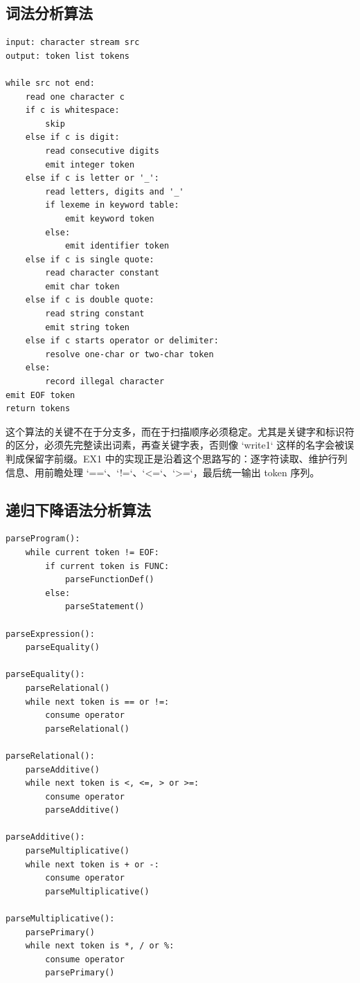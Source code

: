 \documentclass[UTF8,a4paper,12pt]{ctexart}
\begin{document}
\subsection*{词法分析算法}
\begin{lstlisting}[style=mandrillcode,caption={词法分析算法伪代码},label={lst:lexer-pseudo}]
input: character stream src
output: token list tokens

while src not end:
    read one character c
    if c is whitespace:
        skip
    else if c is digit:
        read consecutive digits
        emit integer token
    else if c is letter or '_':
        read letters, digits and '_'
        if lexeme in keyword table:
            emit keyword token
        else:
            emit identifier token
    else if c is single quote:
        read character constant
        emit char token
    else if c is double quote:
        read string constant
        emit string token
    else if c starts operator or delimiter:
        resolve one-char or two-char token
    else:
        record illegal character
emit EOF token
return tokens
\end{lstlisting}

这个算法的关键不在于分支多，而在于扫描顺序必须稳定。尤其是关键字和标识符的区分，必须先完整读出词素，再查关键字表，否则像 `write1` 这样的名字会被误判成保留字前缀。EX1 中的实现正是沿着这个思路写的：逐字符读取、维护行列信息、用前瞻处理 `==`、`!=`、`<=`、`>=`，最后统一输出 token 序列。

\subsection*{递归下降语法分析算法}
\begin{lstlisting}[style=mandrillcode,caption={递归下降语法分析伪代码},label={lst:parser-pseudo}]
parseProgram():
    while current token != EOF:
        if current token is FUNC:
            parseFunctionDef()
        else:
            parseStatement()

parseExpression():
    parseEquality()

parseEquality():
    parseRelational()
    while next token is == or !=:
        consume operator
        parseRelational()

parseRelational():
    parseAdditive()
    while next token is <, <=, > or >=:
        consume operator
        parseAdditive()

parseAdditive():
    parseMultiplicative()
    while next token is + or -:
        consume operator
        parseMultiplicative()

parseMultiplicative():
    parsePrimary()
    while next token is *, / or %:
        consume operator
        parsePrimary()
\end{lstlisting}
\end{document}
